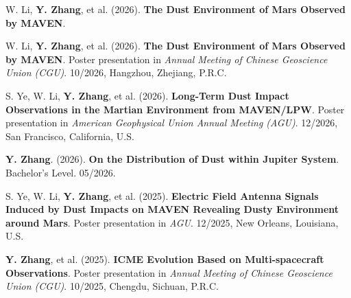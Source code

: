 {\begin{enumerate}[leftmargin=*, align=left, label={\textbf{[\arabic*]}}, widest={[\textbf{C.1}]}, labelsep=1mm, itemindent=0mm, itemsep=0.5mm]
\item[\textbf{[Prep]}] W. Li, \textbf{Y. Zhang}, et al. (2026). \textbf{The Dust Environment of Mars Observed by MAVEN}.

\item[\textbf{[C]}] W. Li, \textbf{Y. Zhang}, et al. (2026). {\textbf{The Dust Environment of Mars Observed by MAVEN}}. Poster presentation in \textit{Annual Meeting of Chinese Geoscience Union (CGU)}. 10/2026, Hangzhou, Zhejiang, P.R.C. 

\item[\textbf{[C]}] S. Ye, W. Li, \textbf{Y. Zhang}, et al. (2026). {\textbf{Long-Term Dust Impact Observations in the Martian Environment from MAVEN/LPW}}. Poster presentation in \textit{American Geophysical Union Annual Meeting (AGU)}. 12/2026, San Francisco, California, U.S. 

\item[\textbf{[T]}] \textbf{Y. Zhang}. (2026). \textbf{On the Distribution of Dust within Jupiter System}. Bachelor's Level. 05/2026.

\item[\textbf{[C]}] S. Ye, W. Li, \textbf{Y. Zhang}, et al. (2025). {\textbf{Electric Field Antenna Signals Induced by Dust Impacts on MAVEN Revealing Dusty Environment around Mars}}. Poster presentation in \textit{AGU}. 12/2025, New Orleans, Louisiana, U.S. 

\item[\textbf{[C]}] \textbf{Y. Zhang}, et al. (2025). {\textbf{ICME Evolution Based on Multi-spacecraft Observations}}. Poster presentation in \textit{Annual Meeting of Chinese Geoscience Union (CGU)}. 10/2025, Chengdu, Sichuan, P.R.C. 






\end{enumerate}
}%
\vspace{-1.6mm}%